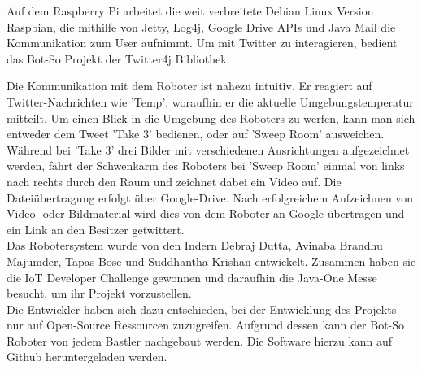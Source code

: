 Auf dem Raspberry Pi arbeitet die weit verbreitete Debian Linux Version Raspbian, die mithilfe von Jetty, Log4j, Google Drive APIs und Java Mail die Kommunikation zum User aufnimmt. Um mit Twitter zu interagieren, bedient das Bot-So Projekt der Twitter4j Bibliothek. 

Die Kommunikation mit dem Roboter ist nahezu intuitiv. Er reagiert auf Twitter-Nachrichten wie 'Temp', woraufhin er die aktuelle Umgebungstemperatur mitteilt. 
Um einen Blick in die Umgebung des Roboters zu werfen, kann man sich entweder dem Tweet 'Take 3' bedienen, oder auf 'Sweep Room' ausweichen. Während bei 'Take 3' drei Bilder mit verschiedenen Ausrichtungen aufgezeichnet werden, fährt der Schwenkarm des Roboters bei 'Sweep Room' einmal von links nach rechts durch den Raum und zeichnet dabei ein Video auf. 
Die Dateiübertragung erfolgt über Google-Drive. Nach erfolgreichem Aufzeichnen von Video- oder Bildmaterial wird dies von dem Roboter an Google übertragen und ein Link an den Besitzer getwittert.\\


Das Robotersystem wurde von den Indern Debraj Dutta, Avinaba Brandhu Majumder, Tapas Bose und Suddhantha Krishan entwickelt. Zusammen haben sie die IoT Developer Challenge gewonnen und daraufhin die Java-One Messe besucht, um ihr Projekt vorzustellen.\\

Die Entwickler haben sich dazu entschieden, bei der Entwicklung des Projekts nur auf Open-Source Ressourcen zuzugreifen. Aufgrund dessen kann der Bot-So Roboter von jedem Bastler nachgebaut werden. Die Software hierzu kann auf Github heruntergeladen werden.
